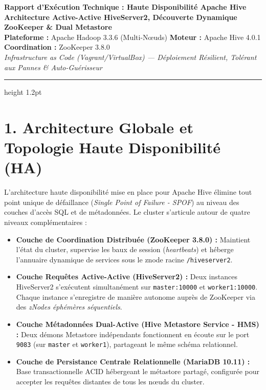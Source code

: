 \documentclass[11pt,a4paper]{article}
\begin{document}
\begin{center}
    {\LARGE \textbf{Rapport d'Exécution Technique : Haute Disponibilité Apache Hive}}\\[2pt]
    {\large \textbf{Architecture Active-Active HiveServer2, Découverte Dynamique ZooKeeper \& Dual Metastore}}\\[3pt]
    \normalsize
    \textbf{Plateforme :} Apache Hadoop 3.3.6 (Multi-Nœuds) \quad \vline \quad \textbf{Moteur :} Apache Hive 4.0.1 \quad \vline \quad \textbf{Coordination :} ZooKeeper 3.8.0\\[1pt]
    \textit{Infrastructure as Code (Vagrant/VirtualBox) --- Déploiement Résilient, Tolérant aux Pannes \& Auto-Guérisseur}
\end{center}
\vspace{-4pt}
\hrule height 1.2pt
\vspace{3pt}

\section*{1. Architecture Globale et Topologie Haute Disponibilité (HA)}
L'architecture haute disponibilité mise en place pour Apache Hive élimine tout point unique de défaillance (\textit{Single Point of Failure - SPOF}) au niveau des couches d'accès SQL et de métadonnées. Le cluster s'articule autour de quatre niveaux complémentaires :
\begin{itemize}[leftmargin=1.2em, topsep=1pt, itemsep=1.5pt]
    \item \textbf{Couche de Coordination Distribuée (ZooKeeper 3.8.0) :} Maintient l'état du cluster, supervise les baux de session (\textit{heartbeats}) et héberge l'annuaire dynamique de services sous le znode racine \texttt{/hiveserver2}.
    \item \textbf{Couche Requêtes Active-Active (HiveServer2) :} Deux instances HiveServer2 s'exécutent simultanément sur \texttt{master:10000} et \texttt{worker1:10000}. Chaque instance s'enregistre de manière autonome auprès de ZooKeeper via des \textit{zNodes éphémères séquentiels}.
    \item \textbf{Couche Métadonnées Dual-Active (Hive Metastore Service - HMS) :} Deux démons Metastore indépendants fonctionnent en écoute sur le port \texttt{9083} (sur \texttt{master} et \texttt{worker1}), partageant le même schéma relationnel.
    \item \textbf{Couche de Persistance Centrale Relationnelle (MariaDB 10.11) :} Base transactionnelle ACID hébergeant le métastore partagé, configurée pour accepter les requêtes distantes de tous les nœuds du cluster.
\end{itemize}
\end{document}
